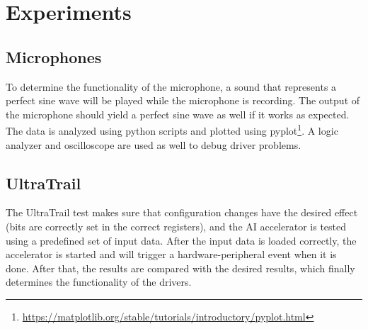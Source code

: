 \section{Experiments}

\subsection{Microphones}

To determine the functionality of the microphone, a sound that represents a perfect sine wave will be
played while the microphone is recording.
The output of the microphone should yield a perfect sine wave as well if it works as expected.\\
The data is analyzed using python scripts and plotted using pyplot\footnote{\url{https://matplotlib.org/stable/tutorials/introductory/pyplot.html}}.
A logic analyzer and oscilloscope are used as well to debug driver problems.

\subsection{UltraTrail}

The UltraTrail test makes sure that configuration changes have the desired effect (bits are correctly set in the correct registers),
and the AI accelerator is tested using a predefined set of input data.
After the input data is loaded correctly, the accelerator is started and will trigger a hardware-peripheral event when it is done.
After that, the results are compared with the desired results, which finally determines the functionality of the drivers.
